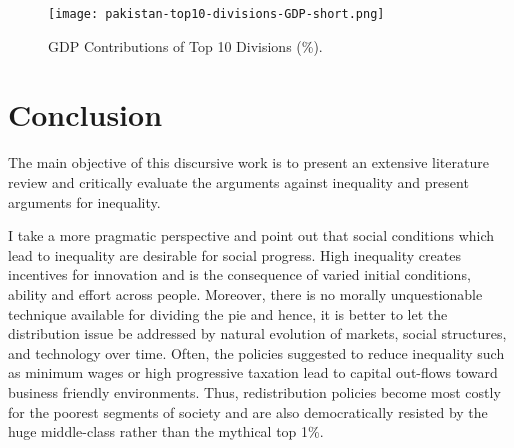 \documentclass[12pt]{article}
\newcommand{\1}{\mathbbm 1}
\begin{document}
		 
		
		
		
		
		
		
		
		
		
		
		
		
		
	
		
	\begin{figure}[H] 
			\texttt{[image: pakistan-top10-divisions-GDP-short.png]}%
		\caption{GDP Contributions of Top 10 Divisions (\%).}
	\end{figure}
		
		
		
		
		
		
		
		
		
		
		
		
		
		
		
		
		
	
			
			
			
	
	 
		
		
	
		\section{Conclusion}
		
		
		The main objective of this discursive work is to present an extensive literature review and critically evaluate the arguments against inequality and present arguments for inequality.
		
		 I take a more pragmatic perspective and point out that social conditions which lead to inequality are desirable for social progress. High inequality creates incentives for innovation and is the consequence of varied initial conditions, ability and effort across people. Moreover, there is no morally unquestionable technique available for dividing the pie and hence, it is better to let the distribution issue be addressed by natural evolution of markets, social structures, and technology over time. Often, the policies suggested to reduce inequality such as minimum wages or high progressive taxation lead to capital out-flows toward business friendly environments. Thus, redistribution policies become most costly for the poorest segments of society and are also democratically resisted by the huge middle-class rather than the mythical top 1\%. 
		
\end{document}
